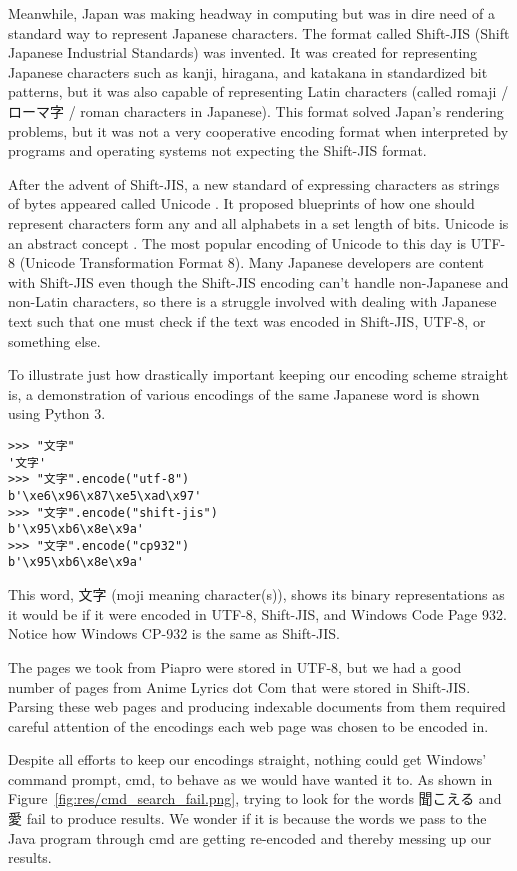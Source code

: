 \documentclass{acm} %
\begin{document}
\begin{CJK}{UTF8}{zhsong}
Meanwhile, Japan was making headway in computing but was in dire need of a standard way to represent Japanese characters. The format called Shift-JIS (Shift Japanese Industrial Standards) was invented. It was created for representing Japanese characters such as kanji, hiragana, and katakana in standardized bit patterns, but it was also capable of representing Latin characters (called romaji / ローマ字 / roman characters in Japanese). This format solved Japan's rendering problems, but it was not a very cooperative encoding format when interpreted by programs and operating systems not expecting the Shift-JIS format.

After the advent of Shift-JIS, a new standard of expressing characters as strings of bytes appeared called Unicode \cite{sjis}. It proposed blueprints of how one should represent characters form any and all alphabets in a set length of bits. Unicode is an abstract concept \cite{unicode-abstract}. The most popular encoding of Unicode to this day is UTF-8 (Unicode Transformation Format 8). Many Japanese developers are content with Shift-JIS even though the Shift-JIS encoding can't handle non-Japanese and non-Latin characters, so there is a struggle involved with dealing with Japanese text such that one must check if the text was encoded in Shift-JIS, UTF-8, or something else.

To illustrate just how drastically important keeping our encoding scheme straight is, a demonstration of various encodings of the same Japanese word is shown using Python 3.

\begin{verbatim}
>>> "文字"
'文字'
>>> "文字".encode("utf-8")
b'\xe6\x96\x87\xe5\xad\x97'
>>> "文字".encode("shift-jis")
b'\x95\xb6\x8e\x9a'
>>> "文字".encode("cp932")
b'\x95\xb6\x8e\x9a'
\end{verbatim}

This word, 文字 (moji meaning character(s)), shows its binary representations as it would be if it were encoded in UTF-8, Shift-JIS, and Windows Code Page 932. Notice how Windows CP-932 is the same as Shift-JIS.

The pages we took from Piapro were stored in UTF-8, but we had a good number of pages from Anime Lyrics dot Com that were stored in Shift-JIS. Parsing these web pages and producing indexable documents from them required careful attention of the encodings each web page was chosen to be encoded in.

Despite all efforts to keep our encodings straight, nothing could get Windows' command prompt, cmd, to behave as we would have wanted it to. As shown in Figure~\ref{fig:res/cmd_search_fail.png}, trying to look for the words 聞こえる and 愛 fail to produce results. We wonder if it is because the words we pass to the Java program through cmd are getting re-encoded and thereby messing up our results.


\end{CJK}
\end{document}
